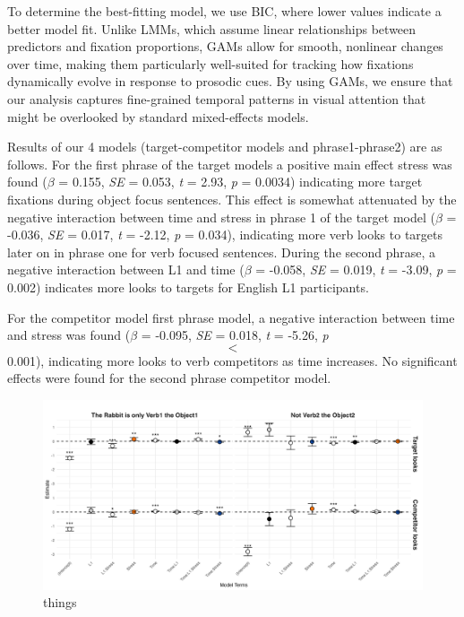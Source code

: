 To determine the best-fitting model, we use BIC, where lower values indicate a better model fit. Unlike LMMs, which assume linear relationships between predictors and fixation proportions, GAMs allow for smooth, nonlinear changes over time, making them particularly well-suited for tracking how fixations dynamically evolve in response to prosodic cues. By using GAMs, we ensure that our analysis captures fine-grained temporal patterns in visual attention that might be overlooked by standard mixed-effects models.

Results of our 4 models (target-competitor models and phrase1-phrase2) are as follows. For the first phrase of the target models a positive main effect stress was found ($\beta$ = 0.155, \textit{SE} = 0.053, \textit{t} = 2.93, \textit{p} = 0.0034) indicating more target fixations during object focus sentences. This effect is somewhat attenuated by the negative interaction between time and stress in phrase 1 of the target model ($\beta$ = -0.036, \textit{SE} = 0.017, \textit{t} = -2.12, \textit{p} = 0.034), indicating more verb looks to targets later on in phrase one for verb focused sentences. During the second phrase, a negative interaction between L1 and time ($\beta$ = -0.058, \textit{SE} = 0.019, \textit{t} = -3.09, \textit{p} = 0.002) indicates more looks to targets for English L1 participants.

For the competitor model first phrase model, a negative interaction between time and stress was found ($\beta$ = -0.095, \textit{SE} = 0.018, \textit{t} = -5.26, \textit{p} $$<$$ 0.001), indicating more looks to verb competitors as time increases. No significant effects were found for the second phrase competitor model.


\begin{figure}[H]  %
    \centering
    \includegraphics[width=\textwidth,height=\textheight,keepaspectratio]{viz/gam_mod_out.png}
    \caption{things}
    \label{fig:gam_mod_out}
\end{figure}

